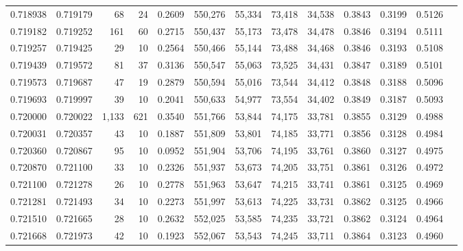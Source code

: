 \begin{tabular}{rrrrrrrrrrrrr}
0.718938 & 0.719179 &    68 &  24 &                                     0.2609 & 550,276 &  55,334 &  73,418 &  34,538 & 0.3843 & 0.3199 & 0.5126 \\
0.719182 & 0.719252 &   161 &  60 &                                     0.2715 & 550,437 &  55,173 &  73,478 &  34,478 & 0.3846 & 0.3194 & 0.5111 \\
0.719257 & 0.719425 &    29 &  10 &                                     0.2564 & 550,466 &  55,144 &  73,488 &  34,468 & 0.3846 & 0.3193 & 0.5108 \\
0.719439 & 0.719572 &    81 &  37 &                                     0.3136 & 550,547 &  55,063 &  73,525 &  34,431 & 0.3847 & 0.3189 & 0.5101 \\
0.719573 & 0.719687 &    47 &  19 &                                     0.2879 & 550,594 &  55,016 &  73,544 &  34,412 & 0.3848 & 0.3188 & 0.5096 \\
0.719693 & 0.719997 &    39 &  10 &                                     0.2041 & 550,633 &  54,977 &  73,554 &  34,402 & 0.3849 & 0.3187 & 0.5093 \\
0.720000 & 0.720022 & 1,133 & 621 &                                     0.3540 & 551,766 &  53,844 &  74,175 &  33,781 & 0.3855 & 0.3129 & 0.4988 \\
0.720031 & 0.720357 &    43 &  10 &                                     0.1887 & 551,809 &  53,801 &  74,185 &  33,771 & 0.3856 & 0.3128 & 0.4984 \\
0.720360 & 0.720867 &    95 &  10 &                                     0.0952 & 551,904 &  53,706 &  74,195 &  33,761 & 0.3860 & 0.3127 & 0.4975 \\
0.720870 & 0.721100 &    33 &  10 &                                     0.2326 & 551,937 &  53,673 &  74,205 &  33,751 & 0.3861 & 0.3126 & 0.4972 \\
0.721100 & 0.721278 &    26 &  10 &                                     0.2778 & 551,963 &  53,647 &  74,215 &  33,741 & 0.3861 & 0.3125 & 0.4969 \\
0.721281 & 0.721493 &    34 &  10 &                                     0.2273 & 551,997 &  53,613 &  74,225 &  33,731 & 0.3862 & 0.3125 & 0.4966 \\
0.721510 & 0.721665 &    28 &  10 &                                     0.2632 & 552,025 &  53,585 &  74,235 &  33,721 & 0.3862 & 0.3124 & 0.4964 \\
0.721668 & 0.721973 &    42 &  10 &                                     0.1923 & 552,067 &  53,543 &  74,245 &  33,711 & 0.3864 & 0.3123 & 0.4960 \\

\end{tabular}
